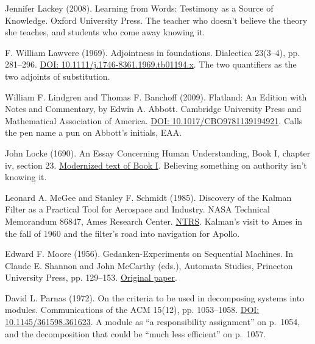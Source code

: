 \documentclass[11pt,twoside]{article}
\theoremstyle{thielethm}
\theoremstyle{thieledef}
\theoremstyle{thieledef}
\theoremstyle{thieledef}
\theoremstyle{thielethm}
\theoremstyle{thieleobs}
\theoremstyle{thielethm}
\begin{document}
\noindent Jennifer Lackey (2008). Learning from Words: Testimony as a Source of Knowledge. Oxford University Press. The teacher who doesn't believe the theory she teaches, and students who come away knowing it.
\par\medskip

\noindent F. William Lawvere (1969). Adjointness in foundations. Dialectica 23(3--4), pp. 281--296. \href{https://doi.org/10.1111/j.1746-8361.1969.tb01194.x}{DOI: 10.1111/j.1746-8361.1969.tb01194.x}. The two quantifiers as the two adjoints of substitution.
\par\medskip

\noindent William F. Lindgren and Thomas F. Banchoff (2009). Flatland: An Edition with Notes and Commentary, by Edwin A. Abbott. Cambridge University Press and Mathematical Association of America. \href{https://doi.org/10.1017/CBO9781139194921}{DOI: 10.1017/CBO9781139194921}. Calls the pen name a pun on Abbott's initials, EAA.
\par\medskip

\noindent John Locke (1690). An Essay Concerning Human Understanding, Book I, chapter iv, section 23. \href{https://www.earlymoderntexts.com/assets/pdfs/locke1690book1.pdf}{Modernized text of Book I}. Believing something on authority isn't knowing it.
\par\medskip

\noindent Leonard A. McGee and Stanley F. Schmidt (1985). Discovery of the Kalman Filter as a Practical Tool for Aerospace and Industry. NASA Technical Memorandum 86847, Ames Research Center. \href{https://ntrs.nasa.gov/citations/19860003843}{NTRS}. Kalman's visit to Ames in the fall of 1960 and the filter's road into navigation for Apollo.
\par\medskip

\noindent Edward F. Moore (1956). Gedanken-Experiments on Sequential Machines. In Claude E. Shannon and John McCarthy (eds.), Automata Studies, Princeton University Press, pp. 129--153. \href{https://www.cs.cmu.edu/~cdm/resources/Moore1956-gedanken-experiments.pdf}{Original paper}.
\par\medskip

\noindent David L. Parnas (1972). On the criteria to be used in decomposing systems into modules. Communications of the ACM 15(12), pp. 1053--1058. \href{https://doi.org/10.1145/361598.361623}{DOI: 10.1145/361598.361623}. A module as ``a responsibility assignment'' on p.~1054, and the decomposition that could be ``much less efficient'' on p.~1057.
\par\medskip
\end{document}
